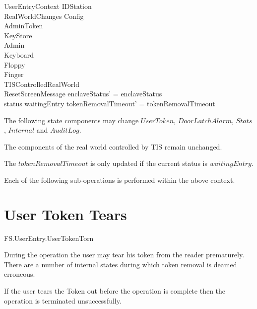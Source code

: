 \begin{schema}{UserEntryContext}
        \Delta IDStation
\\      RealWorldChanges
\also
        \Xi Config
\\      \Xi AdminToken
\\      \Xi KeyStore
\\      \Xi Admin
\\      \Xi Keyboard
\\      \Xi Floppy
\\      \Xi Finger
\also
\\      \Xi TISControlledRealWorld
\also
\\      ResetScreenMessage
\where
        enclaveStatus' = enclaveStatus
\\      status \neq waitingEntry \implies tokenRemovalTimeout' = tokenRemovalTimeout
\end{schema} 

\begin{Zcomment}
\item
The following state components may change $UserToken$,
$DoorLatchAlarm$, $Stats$, $Internal$ and $AuditLog$.
\item
The components of the real world controlled by TIS remain unchanged.
\item
The $tokenRemovalTimeout$ is only updated if the current status is
$waitingEntry$.
\end{Zcomment}

Each of the following sub-operations is performed within the above context.

\section{User Token Tears}

\begin{traceunit}{FS.UserEntry.UserTokenTorn}
\end{traceunit}


During the operation the user may tear his token from the reader
prematurely. There are a number of internal states during which token
removal is deamed erroneous.

If the user tears the Token out before the operation is complete then
the operation is terminated unsuccessfully.

